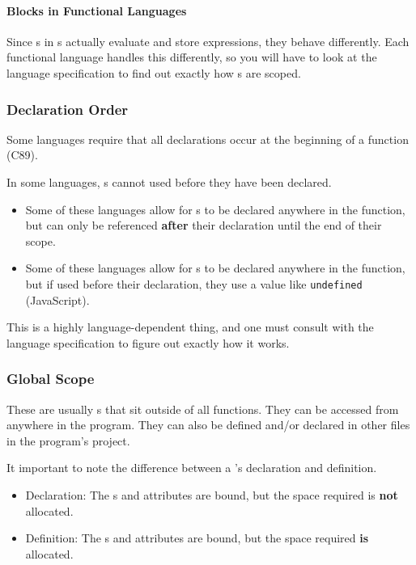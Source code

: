 \paragraph{Blocks in Functional Languages}\label{par:Variable_Block_in_Functional_Languages}
Since s in s actually evaluate and store expressions, they behave differently.
Each functional language handles this differently, so you will have to look at the language specification to find out exactly how s are scoped.

\subsubsection{Declaration Order}\label{subsubsec:Variable_Declaration_Order}
Some languages require that all  declarations occur at the beginning of a function (C89).

In some languages, s cannot used before they have been declared.
\begin{itemize}[noitemsep]
\item Some of these languages allow for s to be declared anywhere in the function, but can only be referenced \textbf{after} their declaration until the end of their scope.
\item Some of these languages allow for s to be declared anywhere in the function, but if used before their declaration, they use a value like \texttt{undefined} (JavaScript).
\end{itemize}

This is a highly language-dependent thing, and one must consult with the language specification to figure out exactly how it works.

\subsubsection{Global Scope}\label{subsubsec:Variable_Global_Scope}
\begin{definition}\label{def:Global_Variable}
  These are usually s that sit outside of all functions.
  They can be accessed from anywhere in the program.
  They can also be defined and/or declared in other files in the program's project.
\end{definition}

It important to note the difference between a 's declaration and definition.
\begin{itemize}[noitemsep]
\item Declaration: The s and attributes are bound, but the  space required is \textbf{not} allocated.
\item Definition: The s and attributes are bound, but the  space required \textbf{is} allocated.
\end{itemize}

